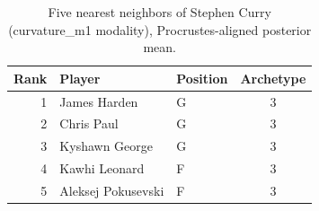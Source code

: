 \begin{table}[htbp]
  \centering\small
  \begin{tabular}{rllc}
    \toprule
    Rank & Player & Position & Archetype \\
    \midrule
    1 & James Harden & G & 3 \\
    2 & Chris Paul & G & 3 \\
    3 & Kyshawn George & G & 3 \\
    4 & Kawhi Leonard & F & 3 \\
    5 & Aleksej Pokusevski & F & 3 \\
    \bottomrule
  \end{tabular}
  \caption{Five nearest neighbors of Stephen Curry (curvature_m1 modality), Procrustes-aligned posterior mean.}
  \label{tab:Stephen_Curry_neighbors_curvature_m1}
\end{table}

